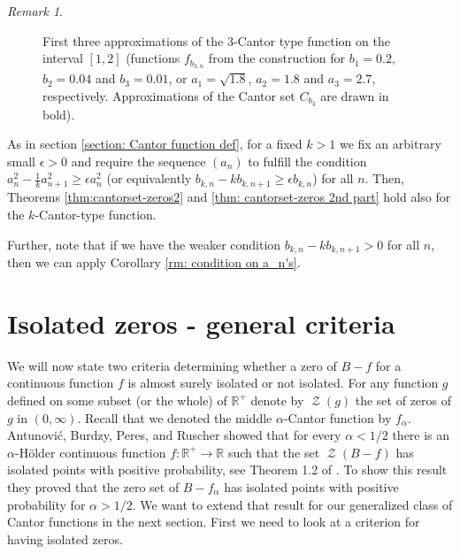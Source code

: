 \documentclass[11pt,reqno]{amsart}
\theoremstyle{plain}
\theoremstyle{definition}
\theoremstyle{remark}
\newtheorem{remark}[theorem]{Remark}
\begin{document}
\begin{remark}
\begin{figure}
\caption{First three approximations of the $3$-Cantor type function on the interval $[1,2]$ (functions $f_{b_{3,n}}$ from the construction for $b_1=0.2$, $b_2=0.04$ and $b_3=0.01$, or $a_1=\sqrt{1.8}$, $a_2=1.8$ and $a_3=2.7$, respectively. Approximations of the Cantor set $C_{b_3}$ are drawn in bold).}

\label{fig:triplecantor}

\end{figure}

As in section \ref{section: Cantor function def}, for a fixed $k>1$ we fix an arbitrary small $\epsilon > 0$ and require the sequence $(a_{n})$ to fulfill the condition $a_{n}^2 - \frac{1}{k}a_{n+1}^2 \geq \epsilon a_{n}^2$ (or equivalently $b_{k,n}- kb_{k,n+1} \geq \epsilon b_{k,n}$) for all $n$. Then, Theorems \ref{thm:cantorset-zeros2} and \ref{thm: cantorset-zeros 2nd part} hold also for the $k$-Cantor-type function.

Further, note that if we have the weaker condition $b_{k,n}- kb_{k,n+1} > 0$ for all $n$, then we can apply Corollary \ref{rm: condition on a_n's}.

\end{remark}

\section{Isolated zeros - general criteria}\label{Isolated zeros - general results}

We will now state two criteria determining whether a zero of $B-f$ for a continuous function $f$ is almost surely isolated or not isolated.
For any function $g$ defined on some subset (or the whole) of $\mathbb{R}^+$ denote by $\operatorname{\mathcal{Z}}(g)$ the set of zeros of $g$ in $(0,\infty)$. Recall that we denoted the middle $\alpha$-Cantor function by $f_\alpha$.
Antunovi\'{c}, Burdzy, Peres, and Ruscher showed that for every $\alpha<1/2$ there is an $\alpha$-{H\"{o}lder } continuous function $f \colon \mathbb{R}^+ \to \mathbb{R}$ such that the set $\operatorname{\mathcal{Z}}(B-f)$ has isolated points with positive probability, see Theorem 1.2 of \cite{ABPR}.
To show this result they proved that the zero set of $B-f_\alpha$ has isolated points with positive probability for $\alpha > 1/2$. We want to extend that result for our generalized
class of Cantor functions in the next section. First we need to look at a criterion for having isolated zeros.
\end{document}
